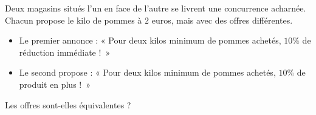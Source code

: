 \documentclass[11pt]{article}
\begin{document}
\begin{exo}
Deux magasins situés l'un en face de l'autre se
livrent une concurrence acharnée. Chacun propose le kilo de pommes à $2$ euros,
mais avec des offres différentes.
\begin{itemize}
  \item Le premier annonce : « Pour deux kilos minimum de pommes achetés, $10\%$
    de réduction immédiate !~»
  \item Le second propose : « Pour deux kilos minimum de pommes achetés, $10\%$
    de produit en plus !~»
\end{itemize}
Les offres sont-elles équivalentes ?
\end{exo}
\end{document}

